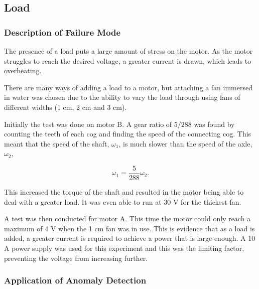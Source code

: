 \subsection{Load}

\subsubsection{Description of Failure Mode}
The presence of a load puts a large amount of stress on the motor. As the motor struggles to reach the desired voltage, a greater current is drawn, which leads to overheating.
        
There are many ways of adding a load to a motor, but attaching a fan immersed in water was chosen due to the ability to vary the load through using fans of different widths (1 cm, 2 cm and 3 cm).
    
Initially the test was done on motor B. A gear ratio of ${5}/{288}$ was found by counting the teeth of each cog and finding the speed of the connecting cog. This meant that the speed of the shaft, $\omega_1$, is much slower than the speed of the axle, $\omega _2$,

\begin{equation}
\omega_1 = \frac{5}{288} \omega_2.
\label{eq:gear_ratio}
\end{equation}

This increased the torque of the shaft and resulted in the motor being able to deal with a greater load. It was even able to run at 30 V for the thickest fan.

A test was then conducted for motor A. This time the motor could only reach a maximum of 4 V when the 1 cm fan was in use. This is evidence that as a load is added, a greater current is required to achieve a power that is large enough. A 10 A power supply was used for this experiment and this was the limiting factor, preventing the voltage from increasing further.

\subsubsection{Application of Anomaly Detection}

